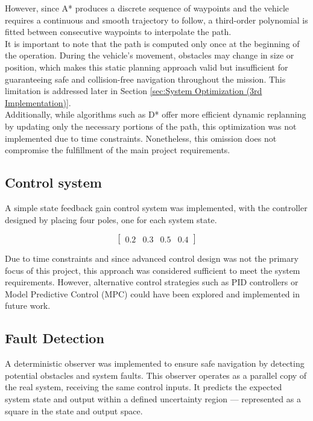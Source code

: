 \documentclass[12pt]{article}
\begin{document}
However, since A* produces a discrete sequence of waypoints and the vehicle requires a continuous and smooth trajectory 
to follow, a third-order polynomial is fitted between consecutive waypoints to interpolate the path.\\

It is important to note that the path is computed only once at the beginning of the operation. During the vehicle's 
movement, obstacles may change in size or position, which makes this static planning approach valid but insufficient 
for guaranteeing safe and collision-free navigation throughout the mission. This limitation is addressed later in Section 
\ref{sec:System Optimization (3rd Implementation)}.\\

Additionally, while algorithms such as D* offer more efficient dynamic replanning by updating only the necessary 
portions of the path, this optimization was not implemented due to time constraints. Nonetheless, this omission 
does not compromise the fulfillment of the main project requirements.

\subsection{Control system}
A simple state feedback gain control system was implemented, with the controller designed by placing four poles, 
one for each system state.

\begin{equation*}
    \begin{bmatrix}
        0.2& 0.3& 0.5& 0.4
    \end{bmatrix}
\end{equation*}

Due to time constraints and since advanced control design was not the primary focus of this project, 
this approach was considered sufficient to meet the system requirements. However, alternative control 
strategies such as PID controllers or Model Predictive Control (MPC) could have been explored and 
implemented in future work.

\subsection{Fault Detection}
A deterministic observer was implemented to ensure safe navigation by detecting potential obstacles and system faults. 
This observer operates as a parallel copy of the real system, receiving the same control inputs. 
It predicts the expected system state and output within a defined uncertainty region — represented as a square in the state 
and output space.\\
\end{document}
